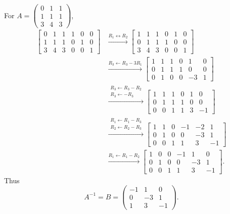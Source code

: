 \begin{example}\label{example:02:inverse}
For \(A=\begin{pmatrix}0&1&1\\1&1&1\\3&4&3\end{pmatrix}\),
\begin{align*}
\left[\begin{array}{rrr|rrr}0&1&1&1&0&0\\1&1&1&0&1&0\\3&4&3&0&0&1\end{array}\right]
&\xrightarrow{R_1\leftrightarrow R_2}
\left[\begin{array}{rrr|rrr}1&1&1&0&1&0\\0&1&1&1&0&0\\3&4&3&0&0&1\end{array}\right]\\
&\xrightarrow{R_3\leftarrow R_3-3R_1}
\left[\begin{array}{rrr|rrr}1&1&1&0&1&0\\0&1&1&1&0&0\\0&1&0&0&-3&1\end{array}\right]\\
&\xrightarrow{\substack{R_3\leftarrow R_3-R_2\\ R_3\leftarrow -R_3}}
\left[\begin{array}{rrr|rrr}1&1&1&0&1&0\\0&1&1&1&0&0\\0&0&1&1&3&-1\end{array}\right]\\
&\xrightarrow{\substack{R_1\leftarrow R_1-R_3\\R_2\leftarrow R_2-R_3}}
\left[\begin{array}{rrr|rrr}1&1&0&-1&-2&1\\0&1&0&0&-3&1\\0&0&1&1&3&-1\end{array}\right]\\
&\xrightarrow{R_1\leftarrow R_1-R_2}
\left[\begin{array}{rrr|rrr}1&0&0&-1&1&0\\0&1&0&0&-3&1\\0&0&1&1&3&-1\end{array}\right].
\end{align*}
Thus
\[
A^{-1}=B=\begin{pmatrix}-1&1&0\\0&-3&1\\1&3&-1\end{pmatrix}.
\]
\end{example}
